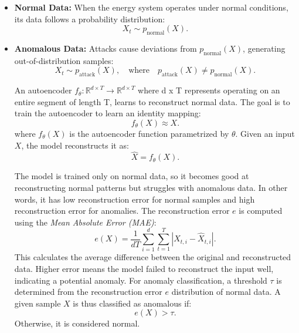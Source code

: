 \begin{itemize} 
    \item \textbf{Normal Data:} When the energy system operates under normal conditions, its data follows a probability distribution:
    \begin{equation}
    X_t \sim p_{\text{normal}}(X).
    \end{equation}

    \item \textbf{Anomalous Data:} Attacks cause deviations from $p_{\text{normal}}(X)$, generating out-of-distribution samples:
    \begin{equation}
    X_t \sim p_{\text{attack}}(X), \quad \text{where} \quad p_{\text{attack}}(X) \neq p_{\text{normal}}(X).
    \end{equation}


An autoencoder $f_\theta: \mathbb{R}^{d \times T} \to \mathbb{R}^{d \times T}$ where d x T represents operating on an entire segment of length T, learns to reconstruct normal data. The goal is to train the autoencoder to learn an identity mapping:
    \begin{equation}
        f_\theta(X) \approx X.
    \end{equation}
    where \( f_\theta(X) \) is the autoencoder function parametrized by \( \theta \).  Given an input $X$, the model reconstructs it as:
    \begin{equation}
        \hat{X} = f_\theta(X).
    \end{equation}
   

The model is trained only on normal data, so it becomes good at reconstructing normal patterns but struggles with anomalous data. In other words, it has low reconstruction error for normal samples and high reconstruction error for anomalies. The reconstruction error $e$ is computed using the \textit{Mean Absolute Error (MAE)}:
    \begin{equation}
        e(X) = \frac{1}{dT} \sum_{i=1}^{d} \sum_{t=1}^{T} |X_{t, i} - \hat{X}_{t, i}|.
    \end{equation}
This calculates the average difference between the original and reconstructed data. Higher error means the model failed to reconstruct the input well, indicating a potential anomaly. For anomaly classification, a threshold $\tau$ is determined from the reconstruction error $e$ distribution of normal data. A given sample $X$ is thus classified as anomalous if:
    \begin{equation}
        e(X) > \tau.
    \end{equation}
    Otherwise, it is considered normal.

\end{itemize}


